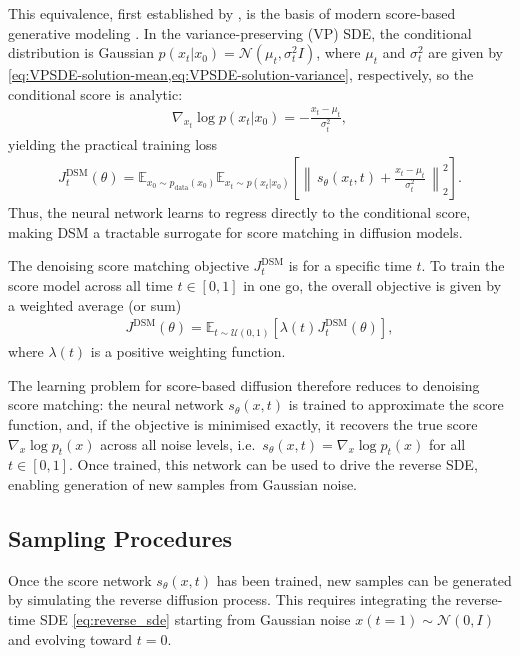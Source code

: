 \documentclass[a4paper,12pt]{article}
\begin{document}
This equivalence, first established by \citet{vincentConnectionScoreMatching2011}, is the basis of modern score-based generative modeling \citep{song2019GenerativeModelingEstimating,song2021ScoreBasedGenerativeModeling}. In the variance-preserving (VP) SDE, the conditional distribution is Gaussian \(p(x_t|x_0)=\mathcal{N}(\mu_t,\sigma_t^2I)\), where \(\mu_t\) and \(\sigma_t^2\) are given by \cref{eq:VPSDE-solution-mean,eq:VPSDE-solution-variance}, respectively, so the conditional score is analytic:
\begin{align*}
    \nabla_{x_t}\log p(x_t|x_0) = -\frac{x_t-\mu_t}{\sigma_t^2},
\end{align*}
yielding the practical training loss
\begin{align*}
    J_t^{\text{DSM}}(\theta)
    = \mathbb{E}_{x_0\sim p_{\text{data}}\left(x_0\right)}\mathbb{E}_{x_t\sim p\left(x_t|x_0\right)}\!\left[
        \left\|\,s_\theta(x_t,t) + \frac{x_t-\mu_t}{\sigma_t^2}\,\right\|_2^2
    \right].
\end{align*}
Thus, the neural network learns to regress directly to the conditional score, making DSM a tractable surrogate for score matching in diffusion models.

The denoising score matching objective \(J^{\text{DSM}}_t\) is for a specific time \(t\). To train the score model across all time \(t\in\left[0,1\right]\) in one go, the overall objective is given by a weighted average (or sum) \citep{song2021ScoreBasedGenerativeModeling}
\begin{align}\label{eq:DSM}
    J^{\text{DSM}}\left(\theta\right)=\mathbb{E}_{t\sim\mathcal{U}(0,1)}\left[\lambda\!\left(t\right)J^{\text{DSM}}_t \left(\theta\right)\right],
\end{align}
where \(\lambda\!\left(t\right)\) is a positive weighting function.

The learning problem for score-based diffusion therefore reduces to denoising score matching: the neural network \(s_\theta(x,t)\) is trained to approximate the score function, and, if the objective is minimised exactly, it recovers the true score \(\nabla_x \log p_t(x)\) across all noise levels, i.e.\ \(s_\theta(x,t) = \nabla_x \log p_t(x)\) for all \(t \in [0,1]\). Once trained, this network can be used to drive the reverse SDE, enabling generation of new samples from Gaussian noise.

\subsection{Sampling Procedures}
Once the score network \(s_\theta(x,t)\) has been trained, new samples can be generated by simulating the reverse diffusion process. This requires integrating the reverse-time SDE \eqref{eq:reverse_sde} starting from Gaussian noise \(x\!\left(t=1\right) \sim \mathcal{N}(0,I)\) and evolving toward \(t=0\).
\end{document}
